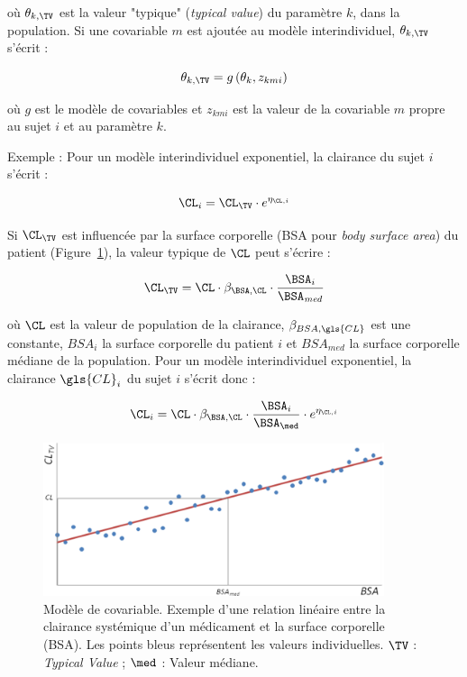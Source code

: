 où $\theta_{k,\TV}$ est la valeur "typique" (\textit{typical value}) du paramètre $k$, dans la population. Si une covariable $m$ est ajoutée au modèle interindividuel, $\theta_{k,\TV}$ s'écrit :

\begin{equation}
\theta_{k, \TV} = g \left( \theta_k , z_{kmi} \right)
\label{eq:45}
\end{equation}

où $g$ est le modèle de covariables et $z_{kmi}$ est la valeur de la covariable $m$ propre au sujet $i$ et au paramètre $k$.

Exemple : Pour un modèle interindividuel exponentiel, la clairance du sujet $i$ s'écrit :

\begin{equation}
\CL_i = \CL_{\TV} \cdot e^{\eta_{\CL,i}}
\label{eq:46}
\end{equation}

Si $\CL_{\TV}$ est influencée par la surface corporelle (BSA pour \textit{body surface area}) du patient (Figure~\ref{fig:9}), la valeur typique de $\CL$ peut s'écrire :

\begin{equation}
\CL_{\TV} = \CL \cdot \beta_{\BSA,\CL} \cdot \frac{\BSA_i}{\BSA_{\mathit{med}}}
\label{eq:47}
\end{equation}

où $\CL$ est la valeur de population de la clairance, $\beta_{BSA,\gls{CL}}$ est une constante, $BSA_i$ la surface corporelle du patient $i$ et $BSA_{med}$ la surface corporelle médiane de la population. Pour un modèle interindividuel exponentiel, la clairance $\gls{CL}_i$ du sujet $i$ s'écrit donc :

\begin{equation}
\CL_i = \CL \cdot \beta_{\BSA,\CL} \cdot \frac{\BSA_i}{\BSA_{\med}} \cdot e^{\eta_{\CL,i}}
\label{eq:48}
\end{equation}

\begin{figure}[htbp]
	\centering
		\includegraphics[width=10cm]{figures/raster/FIG_9}
	\caption[Modèle de covariable.]{Modèle de covariable. Exemple d'une relation linéaire entre la clairance systémique d'un médicament et la surface corporelle (BSA). Les points bleus représentent les valeurs individuelles. $\TV$ : \textit{Typical Value} ; $\med$ : Valeur médiane.}
	\label{fig:9}
\end{figure}

